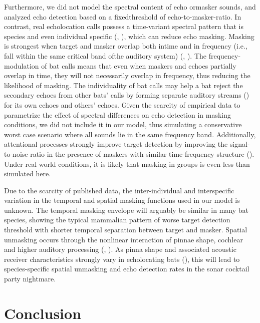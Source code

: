 \documentclass[
]{book}
\begin{document}
Furthermore, we did not model the spectral content of echo ormasker sounds, and analyzed echo detection based on a fixedthreshold of echo-to-masker-ratio. In contrast, real echolocation calls possess a time-variant spectral pattern that is species and even individual specific (\citet{gillam2010a}, \citet{yovel-a}), which can reduce echo masking. Masking is strongest when target and masker overlap both intime and in frequency (i.e., fall within the same critical band ofthe auditory system) (\citet{ebata2003a}, \citet{fletcher1940a}). The frequency-modulation of bat calls means that even when maskers and echoes partially overlap in time, they will not necessarily overlap in frequency, thus reducing the likelihood of masking. The individuality of bat calls may help a bat reject the secondary echoes from other bats' calls by forming separate auditory streams (\citet{fay2008a}) for its own echoes and others' echoes. Given the scarcity of empirical data to parametrize the effect of spectral differences on echo detection in masking conditions, we did not include it in our model, thus simulating a conservative worst case scenario where all sounds lie in the same frequency band. Additionally, attentional processes strongly improve target detection by improving the signal-to-noise ratio in the presence of maskers with similar time-frequency structure (\citet{hafter2008a}). Under real-world conditions, it is likely that masking in groups is even less than simulated here.

Due to the scarcity of published data, the inter-individual and interspecific variation in the temporal and spatial masking functions used in our model is unknown. The temporal masking envelope will arguably be similar in many bat species, showing the typical mammalian pattern of worse target detection threshold with shorter temporal separation between target and masker. Spatial unmasking occurs through the nonlinear interaction of pinnae shape, cochlear and higher auditory processing (\citet{ebata2003a}, \citet{culling-a}). As pinna shape and associated acoustic receiver characteristics strongly vary in echolocating bats (\citet{obrist1993a}), this will lead to species-specific spatial unmasking and echo detection rates in the sonar cocktail party nightmare.

\hypertarget{conclusion}{%
\section{Conclusion}\label{conclusion}}
\end{document}
